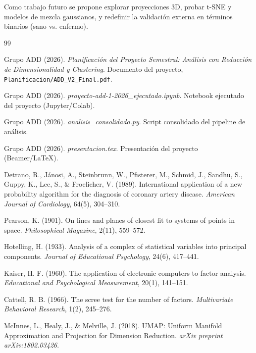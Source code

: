 \documentclass[11pt,a4paper]{article}
\begin{document}
Como trabajo futuro se propone explorar proyecciones 3D, probar t-SNE y modelos de mezcla
gaussianos, y redefinir la validación externa en términos binarios (sano vs. enfermo).

\begin{thebibliography}{99}\label{sec:referencias}

Grupo ADD (2026). \emph{Planificación del Proyecto Semestral: Análisis con Reducción de
Dimensionalidad y Clustering}. Documento del proyecto, \texttt{Planificacion/ADD\_V2\_Final.pdf}.

Grupo ADD (2026). \emph{proyecto-add-1-2026\_ejecutado.ipynb}. Notebook ejecutado del
proyecto (Jupyter/Colab).

Grupo ADD (2026). \emph{analisis\_consolidado.py}. Script consolidado del pipeline de análisis.

Grupo ADD (2026). \emph{presentacion.tex}. Presentación del proyecto (Beamer/LaTeX).

Detrano, R., Jánosi, A., Steinbrunn, W., Pfisterer, M., Schmid, J., Sandhu, S., Guppy, K.,
Lee, S., \& Froelicher, V. (1989). International application of a new probability algorithm
for the diagnosis of coronary artery disease. \emph{American Journal of Cardiology}, 64(5),
304--310.

Pearson, K. (1901). On lines and planes of closest fit to systems of points in space.
\emph{Philosophical Magazine}, 2(11), 559--572.

Hotelling, H. (1933). Analysis of a complex of statistical variables into principal
components. \emph{Journal of Educational Psychology}, 24(6), 417--441.

Kaiser, H. F. (1960). The application of electronic computers to factor analysis.
\emph{Educational and Psychological Measurement}, 20(1), 141--151.

Cattell, R. B. (1966). The scree test for the number of factors. \emph{Multivariate
Behavioral Research}, 1(2), 245--276.

McInnes, L., Healy, J., \& Melville, J. (2018). UMAP: Uniform Manifold Approximation and
Projection for Dimension Reduction. \emph{arXiv preprint arXiv:1802.03426}.


\end{thebibliography}
\end{document}

